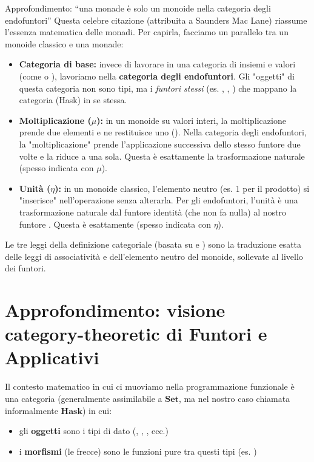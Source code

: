 \begin{gframe}{Approfondimento: ``una monade è solo un monoide nella categoria degli endofuntori''}
Questa celebre citazione (attribuita a Saunders Mac Lane) riassume l'essenza matematica delle monadi. Per capirla, facciamo un parallelo tra un monoide classico e una monade:

\begin{itemize}
    \item \textbf{Categoria di base:} invece di lavorare in una categoria di insiemi e valori (come  o ), lavoriamo nella \textbf{categoria degli endofuntori}. Gli "oggetti" di questa categoria non sono tipi, ma i \textit{funtori stessi} (es. \code{[]}, , ) che mappano la categoria (Hask) in se stessa.
    
    \item \textbf{Moltiplicazione ($\mu$):} in un monoide su valori interi, la moltiplicazione prende due elementi e ne restituisce uno (). Nella categoria degli endofuntori, la "moltiplicazione" prende l'applicazione successiva dello stesso funtore due volte e la riduce a una sola. Questa è esattamente la trasformazione naturale \textbf{} (spesso indicata con $\mu$).
    
    \item \textbf{Unità ($\eta$):} in un monoide classico, l'elemento neutro (es. $1$ per il prodotto) si "inserisce" nell'operazione senza alterarla. Per gli endofuntori, l'unità è una trasformazione naturale dal funtore identità (che non fa nulla) al nostro funtore . Questa è esattamente \textbf{} (spesso indicata con $\eta$).
\end{itemize}

Le tre leggi della definizione categoriale (basata su  e ) sono la traduzione esatta delle leggi di associatività e dell'elemento neutro del monoide, sollevate al livello dei funtori. 
\end{gframe}


\section{Approfondimento: visione category-theoretic di Funtori e Applicativi}
Il contesto matematico in cui ci muoviamo nella programmazione funzionale è una categoria (generalmente assimilabile a $\mathbf{Set}$, ma nel nostro caso chiamata informalmente $\mathbf{Hask}$) in cui:
\begin{itemize}
    \item gli \textbf{oggetti} sono i tipi di dato (, , , ecc.)
    \item i \textbf{morfismi} (le frecce) sono le funzioni pure tra questi tipi (es. )
\end{itemize}

